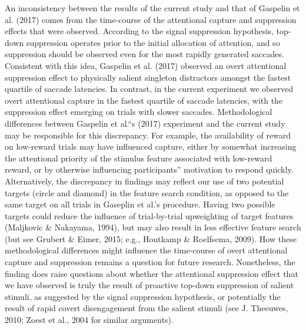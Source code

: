 \documentclass[jou, a4paper, noextraspace,floatsintext]{apa6}
\theoremstyle{definition}
\theoremstyle{definition}
\theoremstyle{definition}
\theoremstyle{remark}
\begin{document}
An inconsistency between the results of the current study and that of
Gaspelin et al. (2017) comes from the time-course of the attentional
capture and suppression effects that were observed. According to the
signal suppression hypothesis, top-down suppression operates prior to
the initial allocation of attention, and so suppression should be
observed even for the most rapidly generated saccades. Consistent with
this idea, Gaspelin et al. (2017) observed an overt attentional
suppression effect to physically salient singleton distractors amongst
the fastest quartile of saccade latencies. In contrast, in the current
experiment we observed overt attentional capture in the fastest quartile
of saccade latencies, with the suppression effect emerging on trials
with slower saccades. Methodological differences between Gaspelin et
al.\enquote{s (2017) experiment and the current study may be responsible
for this discrepancy. For example, the availability of reward on
low-reward trials may have influenced capture, either by somewhat
increasing the attentional priority of the stimulus feature associated
with low-reward reward, or by otherwise influencing participants}
motivation to respond quickly. Alternatively, the discrepancy in
findings may reflect our use of two potential targets (circle and
diamond) in the feature search condition, as opposed to the same target
on all trials in Gaseplin et al.'s procedure. Having two possible
targets could reduce the influence of trial-by-trial upweighting of
target features (Maljkovic \& Nakayama, 1994), but may also result in
less effective feature search (but see Grubert \& Eimer, 2015; e.g.,
Houtkamp \& Roelfsema, 2009). How these methodological differences might
influence the time-course of overt attentional capture and suppression
remains a question for future research. Nonetheless, the finding does
raise questions about whether the attentional suppression effect that we
have observed is truly the result of proactive top-down suppression of
salient stimuli, as suggested by the signal suppression hypothesis, or
potentially the result of rapid covert disengagement from the salient
stimuli (see J. Theeuwes, 2010; Zoest et al., 2004 for similar
arguments).
\end{document}
